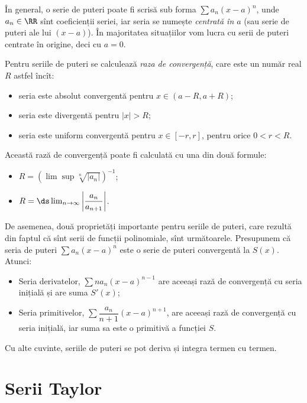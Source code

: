 În general, o serie de puteri poate fi scrisă sub forma $ \sum a_n (x - a)^n $,
unde $ a_n \in \RR $ sînt coeficienții seriei, iar seria se numește \emph{centrată%
în $ a $} (sau serie de puteri ale lui $ (x - a) $). În majoritatea situațiilor
vom lucra cu serii de puteri centrate în origine, deci cu $ a = 0 $.

Pentru seriile de puteri se calculează \emph{raza de convergență}, care este
un număr real $ R $ astfel încît:
\begin{itemize}
    \item seria este absolut convergentă pentru $ x \in (a - R, a + R) $;
    \item seria este divergentă pentru $ |x| > R $;
    \item seria este uniform convergentă pentru $ x \in [-r, r] $, pentru
        orice $ 0 < r < R $.
\end{itemize}

Această rază de convergență poate fi calculată cu una din două formule:
\begin{itemize}
    \item $ R = \left( \lim \sup \sqrt[n]{|a_n|} \right)^{-1} $;
    \item $ R = \ds\lim_{n \to \infty} \left| \dfrac{a_n}{a_{n+1}} \right| $.
\end{itemize}

De asemenea, două proprietăți importante pentru seriile de puteri, care rezultă
din faptul că sînt serii de funcții polinomiale, sînt următoarele. Presupunem
că seria de puteri $ \sum a_n (x - a)^n $ este o serie de puteri convergentă
la $ S(x) $. Atunci:
\begin{itemize}
    \item Seria derivatelor, $ \sum na_n(x - a)^{n-1} $ are aceeași rază de convergență
        cu seria inițială și are suma $ S'(x) $;
    \item Seria primitivelor, $ \sum \dfrac{a_n}{n + 1} (x - a)^{n+1} $, are
        aceeași rază de convergență cu seria inițială, iar suma sa este o
        primitivă a funcției $ S $.
\end{itemize}

Cu alte cuvinte, seriile de puteri se pot deriva și integra termen cu termen.

\section{Serii Taylor}

